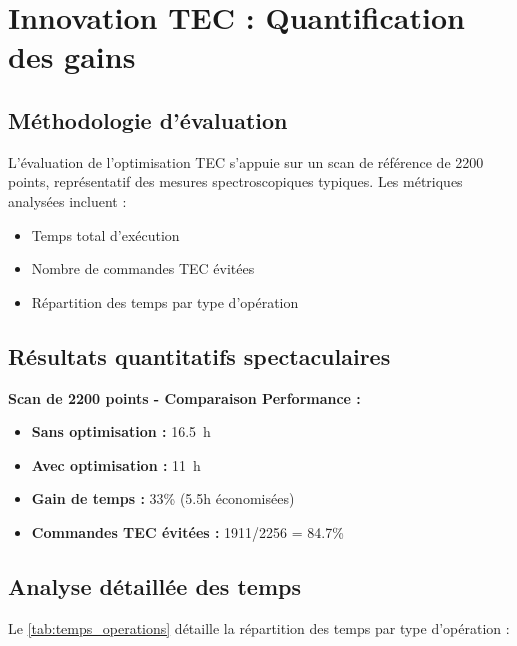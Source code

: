 \section{Innovation TEC : Quantification des gains}

\subsection{Méthodologie d'évaluation}

L'évaluation de l'optimisation TEC s'appuie sur un scan de référence de 2200 points, représentatif des mesures spectroscopiques typiques. Les métriques analysées incluent :
\begin{itemize}
    \item Temps total d'exécution
    \item Nombre de commandes TEC évitées
    \item Répartition des temps par type d'opération
\end{itemize}

\subsection{Résultats quantitatifs spectaculaires}

\begin{keyresult}
\textbf{Scan de 2200 points - Comparaison Performance :}
\begin{itemize}
    \item \textbf{Sans optimisation :} \SI{16.5}{\hour}
    \item \textbf{Avec optimisation :} \SI{11}{\hour}
    \item \textbf{Gain de temps :} 33\% (5.5h économisées)
    \item \textbf{Commandes TEC évitées :} 1911/2256 = 84.7\%
\end{itemize}
\end{keyresult}

\subsection{Analyse détaillée des temps}

Le \cref{tab:temps_operations} détaille la répartition des temps par type d'opération :

